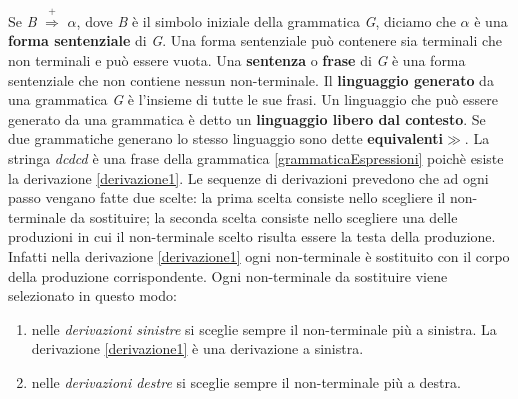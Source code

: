 Se \textit{B} $\overset{+}{\Rightarrow}$ $\alpha$, dove \textit{B} è il simbolo iniziale della grammatica \textit{G}, diciamo che $\alpha$ è una \textbf{forma sentenziale}  di \textit{G}. Una forma sentenziale può contenere sia terminali che non terminali e può essere vuota. Una \textbf{sentenza} o \textbf{frase} di \textit{G} è una forma sentenziale che non contiene nessun non-terminale. Il \textbf{linguaggio generato} da una grammatica \textit{G} è l'insieme di tutte le sue frasi. Un linguaggio che può essere generato da una grammatica è detto un \textbf{linguaggio libero dal contesto}. Se due grammatiche generano lo stesso linguaggio sono dette \textbf{equivalenti}$\gg$. La stringa \textit{dcdcd} è una frase della grammatica \ref{grammaticaEspressioni} poichè esiste la derivazione \ref{derivazione1}. Le sequenze di derivazioni prevedono che ad ogni passo vengano fatte due scelte: la prima scelta consiste nello scegliere il non-terminale da sostituire; la seconda scelta consiste nello scegliere una delle produzioni in cui il non-terminale scelto risulta essere la testa della produzione. Infatti nella derivazione \ref{derivazione1} ogni non-terminale è sostituito con il corpo della produzione corrispondente. Ogni non-terminale da sostituire viene selezionato in questo modo:
\begin{enumerate}
	\item nelle \textit{derivazioni sinistre} si sceglie sempre il non-terminale più a sinistra. La derivazione \ref{derivazione1} è una derivazione a sinistra.
	\item  nelle \textit{derivazioni destre} si sceglie sempre il non-terminale più a destra. 
\end{enumerate}
